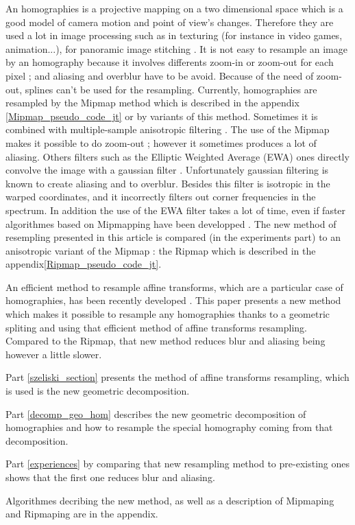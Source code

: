 
An homographies is a projective mapping on a two dimensional space which is a good model of camera motion and point of view's changes. Therefore they are used a lot in image processing such as in texturing \cite{heckbert1983texture} (for instance in video games, animation...), for panoramic image stitching \cite{brown2007automatic}. It is not easy to resample an image by an homography because it involves differents zoom-in or zoom-out for each pixel ; and aliasing and overblur have to be avoid. Because of the need of zoom-out, splines can't be used for the resampling. Currently, homographies are resampled by the Mipmap method \cite{williams1983pyramidal} which is described in the appendix \ref{Mipmap_pseudo_code_jt} or by variants of this method. Sometimes it is combined with multiple-sample anisotropic filtering  \cite{barkans1997high}. The use of the Mipmap makes it possible to do zoom-out ; however it sometimes produces a lot of aliasing. Others filters such as the Elliptic Weighted Average (EWA) ones directly convolve the image with a gaussian filter \cite{greene1986creating}. Unfortunately gaussian filtering is known to create aliasing and to overblur. Besides this filter is isotropic in the warped coordinates, and it incorrectly filters out corner frequencies in the spectrum. In addition the use of the EWA filter takes a lot of time, even if faster algorithmes based on Mipmapping have been developped \cite{mccormack1999feline,huttner1999fast}. The new method of resempling presented in this article is compared (in the experiments part) to an anisotropic variant of the Mipmap : the Ripmap \cite{akenine2008real} which is described in the appendix\ref{Ripmap_pseudo_code_jt}.

	An efficient method to resample affine transforms, which are a particular case of homographies, has been recently developed \cite{szeliski2010high}. This paper presents a new method which makes it possible to resample any homographies thanks to a geometric spliting and using that efficient method of affine transforms resampling. Compared to the Ripmap, that new method reduces blur and aliasing being however a little slower. 
	
	Part \ref{szeliski_section} presents the method of affine transforms resampling, which is used is the new geometric decomposition.
	
	Part \ref{decomp_geo_hom} describes the new geometric decomposition of homographies and how to resample the special homography coming from that decomposition.
	
	Part \ref{experiences} by comparing that new resampling method to pre-existing ones shows that the first one reduces blur and aliasing.
	
	Algorithmes decribing the new method, as well as a description of Mipmaping and Ripmaping are in the appendix.
	
